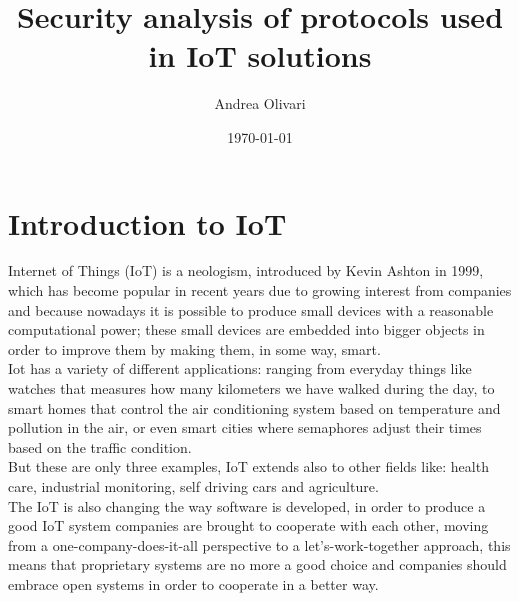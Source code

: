 \documentclass[12pt]{report}
\title{\textbf{Security analysis of protocols used in IoT solutions}}
\author{Andrea Olivari}
\date{\today}
\begin{document}
\maketitle
\tableofcontents{}


\chapter{Introduction to IoT}
\bigskip
Internet of Things (IoT) is a neologism, introduced by Kevin Ashton in 1999, which has become popular in recent years due to
growing interest from companies and because nowadays it is possible to produce small devices with a reasonable computational power;
these small devices are embedded into bigger objects in order to improve them by making them, in some way, smart.\\

Iot has a variety of different applications: ranging from everyday things like watches that measures how many kilometers we have walked during the day, to smart homes that control the air conditioning system based on temperature and pollution in the air, or even smart cities where semaphores adjust their times based on the traffic condition.\\
But these are only three examples, IoT extends also to other fields like: health care, industrial monitoring, self driving cars and agriculture.\\

The IoT is also changing the way software is developed, in order to produce a good IoT system companies are brought to cooperate with each other,
moving from a one-company-does-it-all perspective to a let’s-work-together approach\cite{successiot}, this means that proprietary systems 
are no more a good choice and companies should embrace open systems in order to cooperate in a better way.\\
\end{document}
